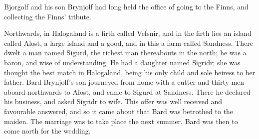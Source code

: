 Bjorgolf and his son Brynjolf had long held the office of going to the Finns, and collecting the Finns' tribute.

Northwards, in Halogaland is a firth called Vefsnir, and in the firth lies an island called Alost, a large island and a good, and in this a farm called Sandness. There dwelt a man named Sigurd, the richest man thereabouts in the north; he was a baron, and wise of understanding. He had a daughter named Sigridr; she was thought the best match in Halogaland, being his only child and sole heiress to her father. Bard Brynjolf's son journeyed from home with a cutter and thirty men aboard northwards to Alost, and came to Sigurd at Sandness. There he declared his business, and asked Sigridr to wife. This offer was well received and favourable answered, and so it came about that Bard was betrothed to the maiden. The marriage was to take place the next summer. Bard was then to come north for the wedding.
